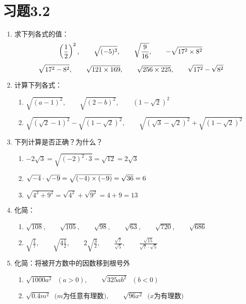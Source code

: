 \section*{习题3.2}
\begin{enumerate}
    \item 求下列各式的值：
\[\left(\dfrac{1}{2}\right)^2,\qquad \sqrt{(-5)^2},\qquad \sqrt{\dfrac{9}{16}},\qquad -\sqrt{17^2\times 8^2}  \]
\[\sqrt{17^2-8^2},\qquad \sqrt{121\times 169},\qquad \sqrt{256\times 225},\qquad \sqrt{17^2}-\sqrt{8^2}\]

\item 计算下列各式：
\begin{enumerate}
    \item $\sqrt{(a-1)^2},\qquad \sqrt{(2-b)^2},\qquad \left(1-\sqrt{2}\right)^2$
    \item $\sqrt{\left(\sqrt{2}-1\right)^2}-\sqrt{\left(1-\sqrt{2}\right)^2},\qquad \sqrt{\left(\sqrt{3}-\sqrt{2}\right)^2}+\sqrt{\left(1-\sqrt{2}\right)^2}$
\end{enumerate}

\item 下列计算是否正确？为什么？
\begin{enumerate}
    \item $-2\sqrt{3}=\sqrt{(-2)^2\cdot 3}=\sqrt{12}=2\sqrt{3}$
    \item $\sqrt{-4}\cdot \sqrt{-9}=\sqrt{(-4)\times(-9)}=\sqrt{36}=6$
    \item $\sqrt{4^2+9^2}=\sqrt{4^2}+\sqrt{9^2}=4+9=13$
\end{enumerate}

\item 化简：
\begin{enumerate}
    \item $\sqrt{108},\qquad \sqrt{105},\qquad \sqrt{98},\qquad \sqrt{63},\qquad \sqrt{720},\qquad \sqrt{686}$
    \item $\sqrt{\frac{1}{7}},\qquad \sqrt{4\frac{1}{2}},\qquad 2\sqrt{\frac{3}{2}},\qquad \frac{\sqrt{7}}{\sqrt{5}},\qquad \frac{\sqrt{15}}{\sqrt{7}\cdot \sqrt{5}}$
\end{enumerate}

\item 化简：将被开方数中的因数移到根号外
\begin{enumerate}
    \item $\sqrt{1000a^2}\;\; (a>0),\qquad \sqrt{325ab^2}\;\; (b<0)$
    \item $\sqrt{0.4m^2}\;\; \text{($m$为任意有理数)},\qquad \sqrt{96x^2}\;\;\text{($x$为有理数)}$
\end{enumerate}


\end{enumerate}
